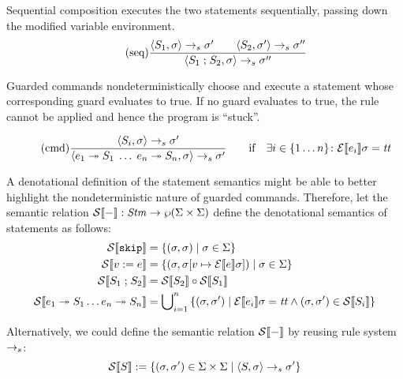 \documentclass{article}
\begin{document}
Sequential composition executes the two statements sequentially, passing down the modified variable environment.
\begin{equation*}
	\tag{seq}
	\dfrac
	{
		\langle S_1, \sigma \rangle
			\rightarrow_s
		\sigma'
		\qquad
		\langle S_2, \sigma' \rangle
			\rightarrow_s
		\sigma''
	}
	{
		\langle S_1 \; \mathtt{;} \; S_2, \sigma \rangle
			\rightarrow_s
		\sigma''
	}
\end{equation*}

Guarded commands nondeterministically choose and execute a statement whose corresponding guard evaluates to true. If no guard
evaluates to true, the rule cannot be applied and hence the program is ``stuck''.

\begin{equation*}
	\tag{cmd}
	\dfrac
	{
		\langle S_i, \sigma \rangle
			\rightarrow_s
		\sigma'
	}
	{
		\langle e_1 \; \mathtt{\twoheadrightarrow} \; S_1 \; \ldots \; e_n \; \mathtt{\twoheadrightarrow} \; S_n, \sigma \rangle
			\rightarrow_s
		\sigma'
	}
	\qquad \text{if} \quad \exists i \in \{1 \ldots n\} \colon \mathcal{E} \llbracket e_i \rrbracket \sigma = \mathit{tt}
\end{equation*}

A denotational definition of the statement semantics might be able to better highlight the nondeterministic nature of guarded
commands. Therefore, let the semantic relation $\mathcal{S} \llbracket - \rrbracket : \mathit{Stm} \rightarrow \wp (\Sigma \times \Sigma)$ define the
denotational semantics of statements as follows:
\begin{align*}
	\mathcal{S} \llbracket \mathtt{skip} \rrbracket &= \{ (\sigma, \sigma) \mid \sigma \in \Sigma \}
	\\
	\mathcal{S} \llbracket v\; \mathtt{:=}\; e \rrbracket &= \{ (\sigma, \sigma[v \mapsto \mathcal{E} \llbracket e \rrbracket \sigma]) \mid \sigma \in \Sigma \}
	\\
	\mathcal{S} \llbracket S_1 \; \mathtt{;} \; S_2 \rrbracket &= \mathcal{S} \llbracket S_2 \rrbracket \circ \mathcal{S} \llbracket S_1 \rrbracket
	\\
	\mathcal{S} \llbracket e_1 \; \mathtt{\twoheadrightarrow} \; S_1 \ldots e_n \; \mathtt{\twoheadrightarrow} \; S_n \rrbracket &= 
		\bigcup\nolimits_{i = 1}^n 
		{\{ (\sigma, \sigma') \mid \mathcal{E} \llbracket e_i \rrbracket \sigma = \mathit{tt} \wedge (\sigma, \sigma') \in \mathcal{S} \llbracket S_i \rrbracket \}}
\end{align*}

Alternatively, we could define the semantic relation $\mathcal{S} \llbracket - \rrbracket$ by reusing rule system $\rightarrow_s$:
\begin{equation*}
	\mathcal{S} \llbracket S \rrbracket := \{ (\sigma, \sigma') \in \Sigma \times \Sigma \mid \langle S, \sigma \rangle \rightarrow_s \sigma' \}
\end{equation*}
\end{document}
